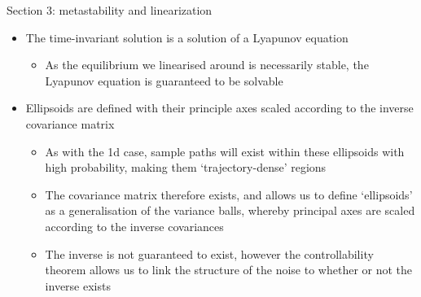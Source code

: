 \documentclass[presentation]{beamer}
\begin{document}
\begin{frame}[label={sec:org4e7cb73},plain]{Section 3: metastability and linearization}
\vfill
\begin{itemize}
\item The time-invariant solution is a solution of a Lyapunov equation
\begin{itemize}
\item As the equilibrium we linearised around is necessarily stable, the Lyapunov equation is guaranteed to be solvable
\end{itemize}
\end{itemize}
\vfill
\begin{itemize}
\item Ellipsoids are defined with their principle axes scaled according to the inverse covariance matrix
\begin{itemize}
\item As with the 1d case, sample paths will exist within these ellipsoids with high probability, making them `trajectory-dense' regions
\item The covariance matrix therefore exists, and allows us to define `ellipsoids' as a generalisation of the variance balls, whereby principal axes are scaled according to the inverse covariances
\item The inverse is not guaranteed to exist, however the controllability theorem allows us to link the structure of the noise to whether or not the inverse exists
\end{itemize}
\end{itemize}
\end{frame}
\end{document}
